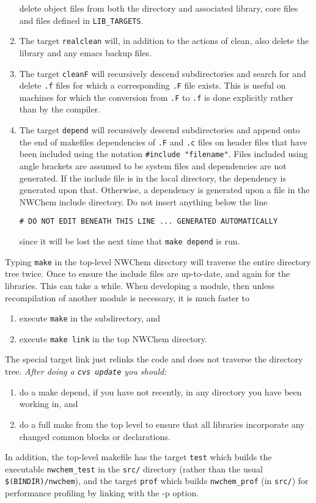\begin{enumerate}
  delete object files from both the directory and associated library, 
  core files and files defined in {\tt LIB\_TARGETS}.
\item The target {\tt realclean} will, in addition to the actions of
  clean, also delete the library and any emacs backup files.
\item The target {\tt cleanF} will recursively descend subdirectories
  and search for and delete \verb+.f+ files for which a corresponding
  \verb+.F+ file exists.  This is useful on machines for which the
  conversion from \verb+.F+ to \verb+.f+ is done explicitly rather
  than by the compiler.
\item The target {\tt depend} will recursively descend subdirectories
  and append onto the end of makefiles dependencies of \verb+.F+ and
  \verb+.c+ files on header files that have been included using the
  notation \verb+#include "filename"+.  Files included using angle
  brackets are assumed to be system files and dependencies are not
  generated.  If the include file is in the local directory, the
  dependency is generated upon that.  Otherwise, a dependency is
  generated upon a file in the NWChem include directory.
  Do not insert anything below the line
\begin{verbatim}
# DO NOT EDIT BENEATH THIS LINE ... GENERATED AUTOMATICALLY
\end{verbatim}
  since it will be lost the next time that \verb+make depend+
  is run.
\end{enumerate}

Typing {\tt make} in the top-level NWChem directory will traverse the
entire directory tree twice.  Once to ensure the include files are
up-to-date, and again for the libraries.  This can take a while.
When developing a module, then unless recompilation of another module
is necessary, it is much faster to 
\begin{enumerate}
\item execute {\tt make} in the subdirectory, and
\item execute {\tt make link} in the top NWChem directory.
\end{enumerate}
The special target link just relinks the code and does not traverse
the directory tree.  {\em After doing a \verb+cvs update+ you should:}
\begin{enumerate}
\item do a make depend, if you have not recently, in any directory you
  have been working in, and
\item do a full make from the top level to ensure that all libraries
  incorporate any changed common blocks or declarations.
\end{enumerate}

In addition, the top-level makefile has the target {\tt test} which
builds the executable \verb+nwchem_test+ in the \verb+src/+ directory
(rather than the usual \verb+$(BINDIR)/nwchem+), %
and the target {\tt prof} 
which builds \verb+nwchem_prof+ (in \verb+src/+)
for performance profiling by linking with the -p option.

